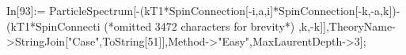 In[93]:= ParticleSpectrum[-(kT1*SpinConnection[-i,a,i]*SpinConnection[-k,-a,k])-(kT1*SpinConnecti (*omitted 3472 characters for brevity*) ,k,-k]],TheoryName->StringJoin["Case",ToString[51]],Method->"Easy",MaxLaurentDepth->3];